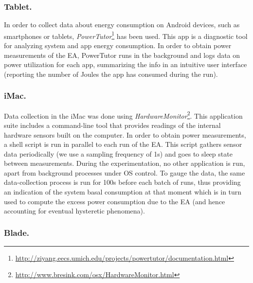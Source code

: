 
\subsubsection*{Tablet.}
In order to collect data about energy consumption on Android devices, such as smartphones or tablets, \emph{PowerTutor}\footnote{\url{http://ziyang.eecs.umich.edu/projects/powertutor/documentation.html}} \cite{powertutor2} has been used. 
This app is a diagnostic tool for analyzing system and app energy consumption.
In order to obtain power measurements of the EA, PowerTutor runs in the background and logs data on power utilization for each app, summarizing the info in an intuitive user interface (reporting the number of Joules the app has consumed during the run).


\subsubsection*{iMac.}
Data collection in the iMac was done using \emph{HardwareMonitor}\footnote{\url{http://www.bresink.com/osx/HardwareMonitor.html}}. 
This application suite includes a command-line tool that provides readings of the internal
hardware sensors built on the computer. In order to obtain power measurements, a shell
script is run in parallel to each run of the EA. This script gathers sensor data periodically
(we use a sampling frequency of 1s) and goes to sleep state between measurements. 
During the experimentation, no other application is run, apart from background processes 
under OS control. 
To gauge the data,
the same data-collection process is run for 100s before each batch of runs, thus providing
an indication of the system basal consumption at that moment which is in turn used to 
compute the excess power consumption due to the EA (and hence accounting for
eventual hysteretic phenomena).

\subsubsection*{Blade.}

